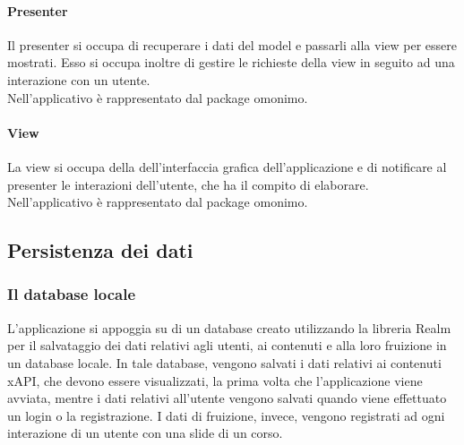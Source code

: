 \documentclass[../Tesi.tex]{subfiles}
\begin{document}
		\paragraph*{Presenter}
		Il presenter si occupa di recuperare i dati del model e passarli alla view per essere mostrati. Esso si occupa inoltre di gestire le richieste della view in seguito ad una interazione con un utente. \\ Nell'applicativo è rappresentato dal package omonimo.

		\paragraph*{View}
		La view si occupa della dell'interfaccia grafica dell'applicazione e di notificare al presenter le interazioni dell'utente, che ha il compito di elaborare. \\ Nell'applicativo è rappresentato dal package omonimo.
	
	\subsection{Persistenza dei dati}
		\subsubsection{Il database locale}
		L'applicazione si appoggia su di un database creato utilizzando la libreria Realm per il salvataggio dei dati relativi agli utenti, ai contenuti e alla loro fruizione in un database locale. In tale database, vengono salvati i dati relativi ai contenuti xAPI, che devono essere visualizzati, la prima volta che l'applicazione viene avviata, mentre i dati relativi all'utente vengono salvati quando viene effettuato un login o la registrazione. I dati di fruizione, invece, vengono registrati ad ogni interazione di un utente con una slide di un corso.
			
\end{document}

